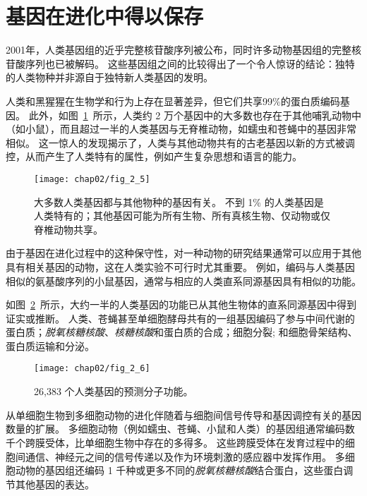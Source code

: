 


\section{基因在进化中得以保存}

2001年，人类基因组的近乎完整核苷酸序列被公布，同时许多动物基因组的完整核苷酸序列也已被解码。
这些基因组之间的比较得出了一个令人惊讶的结论：独特的人类物种并非源自于独特新人类基因的发明。



人类和黑猩猩在生物学和行为上存在显著差异，但它们共享99\%的蛋白质编码基因。
此外，如图~\ref{fig:2_5}~所示，人类约 2 万个基因中的大多数也存在于其他哺乳动物中（如小鼠），而且超过一半的人类基因与无脊椎动物，如蠕虫和苍蝇中的基因非常相似。
这一惊人的发现揭示了，人类与其他动物共有的古老基因以新的方式被调控，从而产生了人类特有的属性，例如产生复杂思想和语言的能力。


\begin{figure}[htbp]
	\centering
	\texttt{[image: chap02/fig\_2\_5]}
	\caption{大多数人类基因都与其他物种的基因有关。
		不到 1\% 的人类基因是人类特有的；其他基因可能为所有生物、所有真核生物、仅动物或仅脊椎动物共享\cite{international2001initial}。}
	\label{fig:2_5}
\end{figure}


由于基因在进化过程中的这种保守性，对一种动物的研究结果通常可以应用于其他具有相关基因的动物，这在人类实验不可行时尤其重要。
例如，编码与人类基因相似的氨基酸序列的小鼠基因，通常与相应的人类直系同源基因具有相似的功能。




如图~\ref{fig:2_6}~所示，大约一半的人类基因的功能已从其他生物体的直系同源基因中得到证实或推断。
人类、苍蝇甚至单细胞酵母共有的一组基因编码了参与中间代谢的蛋白质；\textit{脱氧核糖核酸}、\textit{核糖核酸}和蛋白质的合成；细胞分裂; 和细胞骨架结构、蛋白质运输和分泌。


\begin{figure}[htbp]
	\centering
	\texttt{[image: chap02/fig\_2\_6]}
	\caption{26,383 个人类基因的预测分子功能\cite{venter2001sequence}。}
	\label{fig:2_6}
\end{figure}


从单细胞生物到多细胞动物的进化伴随着与细胞间信号传导和基因调控有关的基因数量的扩展。
多细胞动物（例如蠕虫、苍蝇、小鼠和人类）的基因组通常编码数千个跨膜受体，比单细胞生物中存在的多得多。 
这些跨膜受体在发育过程中的细胞间通信、神经元之间的信号传递以及作为环境刺激的感应器中发挥作用。
多细胞动物的基因组还编码 1 千种或更多不同的\textit{脱氧核糖核酸}结合蛋白，这些蛋白调节其他基因的表达。




